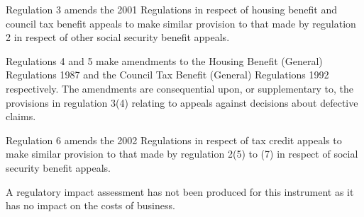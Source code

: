 \documentclass[12pt,a4paper]{article}
\begin{document}
Regulation 3 amends the 2001 Regulations in respect of housing benefit and council tax benefit appeals to make similar provision to that made by regulation 2 in respect of other social security benefit appeals.

Regulations 4 and 5 make amendments to the Housing Benefit (General) Regulations 1987 and the Council Tax Benefit (General) Regulations 1992 respectively. The amendments are consequential upon, or supplementary to, the provisions in regulation 3(4) relating to appeals against decisions about defective claims.

Regulation 6 amends the 2002 Regulations in respect of tax credit appeals to make similar provision to that made by regulation 2(5) to (7) in respect of social security benefit appeals.

A regulatory impact assessment has not been produced for this instrument as it has no impact on the costs of business. 
\end{document}
